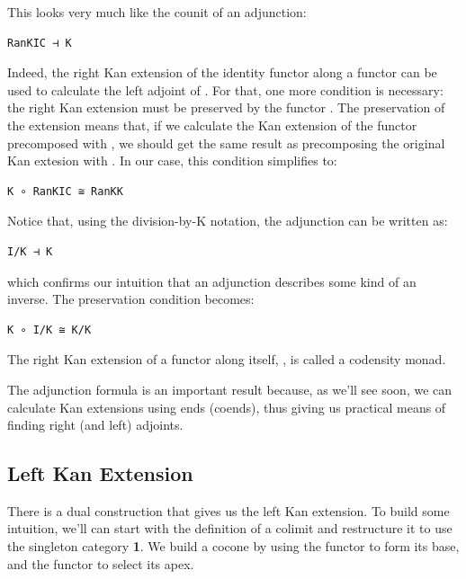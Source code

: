 This looks very much like the counit of an adjunction:

\begin{verbatim}
RanKIC ⊣ K
\end{verbatim}

Indeed, the right Kan extension of the identity functor along a functor
 can be used to calculate the left adjoint of . For
that, one more condition is necessary: the right Kan extension must be
preserved by the functor . The preservation of the extension
means that, if we calculate the Kan extension of the functor precomposed
with , we should get the same result as precomposing the
original Kan extesion with . In our case, this condition
simplifies to:

\begin{verbatim}
K ∘ RanKIC ≅ RanKK
\end{verbatim}

Notice that, using the division-by-K notation, the adjunction can be
written as:

\begin{verbatim}
I/K ⊣ K
\end{verbatim}

which confirms our intuition that an adjunction describes some kind of
an inverse. The preservation condition becomes:

\begin{verbatim}
K ∘ I/K ≅ K/K
\end{verbatim}

The right Kan extension of a functor along itself, , is
called a codensity monad.

The adjunction formula is an important result because, as we'll see
soon, we can calculate Kan extensions using ends (coends), thus giving
us practical means of finding right (and left) adjoints.

\subsection{Left Kan Extension}\label{left-kan-extension}

There is a dual construction that gives us the left Kan extension. To
build some intuition, we'll can start with the definition of a colimit
and restructure it to use the singleton category \textbf{1}. We build a
cocone by using the functor  to form its
base, and the functor  to select its apex.

